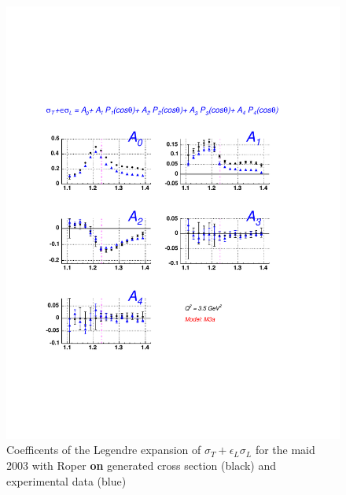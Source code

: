 \begin{figure}[h]
 \begin{center}
 \includegraphics[width = 12cm, bb=30 130 540 700]{analysis/img/A_comp_m03a} 
  \caption[Coefficents of the Legendre expansion of $\sigma_T+\epsilon_L\sigma_L$ for the maid 2003 with Roper {\bf on} 
  generated cross 
  section  and experimental data ]
{ Coefficents of the Legendre expansion of $\sigma_T+\epsilon_L\sigma_L$ for the maid 2003 with Roper {\bf on}  generated cross 
  section (black) and experimental data (blue) }
 \label{fig:A_comp_m03a}
\end{center}
\end{figure}

